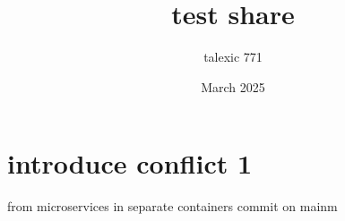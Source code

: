 \documentclass{article}
\title{test share}
\author{talexic 771 }
\date{March 2025}
\begin{document}
\maketitle

\section{introduce conflict 1}
from microservices in separate containers commit on mainm
\end{document}
